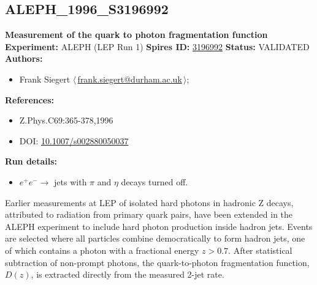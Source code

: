 \clearpage


\clearpage

\subsection[ALEPH\_1996\_S3196992]{ALEPH\_1996\_S3196992\,\cite{Buskulic:1995au}}
\textbf{Measurement of the quark to photon fragmentation function}\newline
\textbf{Experiment:} ALEPH (LEP Run 1) \newline
\textbf{Spires ID:} \href{http://www.slac.stanford.edu/spires/find/hep/www?rawcmd=key+3196992}{3196992}\newline
\textbf{Status:} VALIDATED\newline
\textbf{Authors:}
\begin{itemize}
  \item Frank Siegert $\langle\,$\href{mailto:frank.siegert@durham.ac.uk}{frank.siegert@durham.ac.uk}$\,\rangle$;
\end{itemize}
\textbf{References:}
\begin{itemize}
  \item Z.Phys.C69:365-378,1996
  \item DOI: \href{http://dx.doi.org/10.1007/s002880050037}{10.1007/s002880050037}
\end{itemize}
\textbf{Run details:}
\begin{itemize}

  \item $e^+e^-\to$ jets with $\pi$ and $\eta$ decays turned off.\end{itemize}

\noindent Earlier measurements at LEP of isolated hard photons in hadronic Z decays, attributed to radiation from primary quark pairs, have been extended in the ALEPH experiment to include hard photon production inside hadron jets. Events are selected where all particles combine democratically to form hadron jets, one of which contains a photon with a fractional energy $z > 0.7$. After  statistical subtraction of non-prompt photons, the quark-to-photon fragmentation function, $D(z)$, is extracted directly from the measured 2-jet rate.

\clearpage


\clearpage

